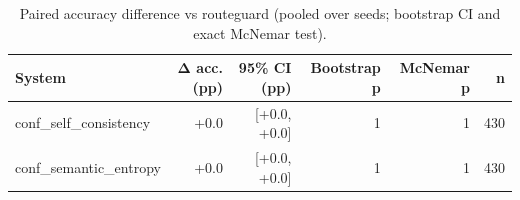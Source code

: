\begin{table}[t]
\centering
\small
\caption{Paired accuracy difference vs routeguard (pooled over seeds; bootstrap CI and exact McNemar test).}
\label{tab:significance}
\begin{tabular}{lrrrrr}
\toprule
System & Δ acc. (pp) & 95\% CI (pp) & Bootstrap p & McNemar p & n \\
\midrule
conf\_self\_consistency & +0.0 & [+0.0, +0.0] & 1 & 1 & 430 \\
conf\_semantic\_entropy & +0.0 & [+0.0, +0.0] & 1 & 1 & 430 \\
\bottomrule
\end{tabular}
\end{table}
